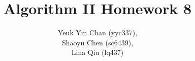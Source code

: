 \documentclass[12pt]{article}
\begin{document}
 
 
\title{Algorithm II Homework 8}
\author{Yeuk Yin Chan (yyc337),\\
Shaoyu Chen (sc6439),\\
Lina Qiu (lq437)}

\maketitle







 
\end{document}
